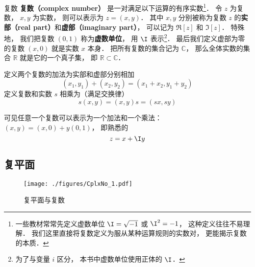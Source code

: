 

\begin{definition}{复数}
\textbf{复数（complex number）} 是一对满足以下运算的有序实数\footnote{一些教材常常先定义虚数单位 $\I = \sqrt{-1}$ 或 $\I^2 = -1$， 这种定义往往不易理解． 我们这里直接将复数定义为服从某种运算规则的实数对， 更能揭示复数的本质\cite{Rudin}．}． 令 $z$ 为复数， $x, y$ 为实数， 则可以表示为 $z = (x, y)$． 其中 $x,y$ 分别被称为复数 $z$ 的\textbf{实部（real part）}和\textbf{虚部（imaginary part）}， 可以记为 $\Re[z]$ 和 $\Im[z]$． 特殊地， 我们把复数 $(0, 1)$ 称为\textbf{虚数单位}， 用 $\I$ 表示\footnote{为了与变量 $i$ 区分， 本书中虚数单位使用正体的 $\I$．}． 最后我们定义虚部为零的复数 $(x, 0)$ 就是实数 $x$ 本身． 把所有复数的集合记为 $\mathbb C$， 那么全体实数的集合 $\mathbb R$ 就是它的一个真子集， 即 $\mathbb R \subset \mathbb C$．

定义两个复数的加法为实部和虚部分别相加
\begin{equation}\label{CplxNo_eq1}
(x_1, y_1) + (x_2, y_2) = (x_1+ x_2, y_1 + y_2)
\end{equation}
定义复数和实数 $s$ 相乘为（满足交换律）
\begin{equation}\label{CplxNo_eq4}
s(x, y) = (x, y)s = (sx, sy)
\end{equation}
\end{definition}
可见任意一个复数可以表示为一个加法和一个乘法： $(x, y) = (x, 0) + y(0, 1)$， 即熟悉的
\begin{equation}
z = x + \I y
\end{equation}

\subsection{复平面}
\begin{figure}[ht]
\centering
\texttt{[image: ./figures/CplxNo\_1.pdf]}
\caption{复平面与复数} \label{CplxNo_fig1}
\end{figure}

